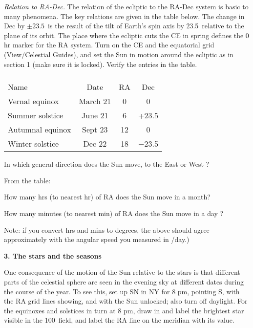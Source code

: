 \bigskip\noindent
\emph{Relation to RA-Dec.} The relation of the ecliptic to the RA-Dec
system is basic to many phenomena. The key relations are given in the
table below. The change in Dec by $\pm 23.5$\deg\ is the
result of the tilt of Earth's spin axis by 23.5\deg\ relative to the
plane of its orbit.  The place where the ecliptic cuts the CE in
spring defines the 0 hr marker for the RA system. Turn on the
CE and the equatorial grid (View/Celestial Guides), and
set the Sun in motion around the ecliptic as in section 1 (make sure
it is locked). Verify the entries in the table.


\begin{center}
\begin{tabular}{lccc} \hline \\ [-6pt]
Name & Date  & \hspace{1cm} RA \hspace{1cm} &Dec \\ [6pt]
\hline
Vernal equinox & March 21  & 0 & 0    \\ \hline
Summer solstice & June 21  & 6 & +23.5 \\ \hline
Autumnal equinox & Sept 23 & 12 &  0     \\ \hline
Winter solstice & Dec 22 & 18  & $-$23.5  \\ \hline
\end{tabular}
\end{center}



\medskip

In which general direction does the Sun move, to the East or West ?  \makebox[2cm]{\hrulefill}

From the table:

How many hrs (to nearest hr) of RA does the Sun move in a month?  \makebox[2cm]{\hrulefill}

How many minutes (to nearest min) of RA does the Sun move in a day ? 
\makebox[2cm]{\hrulefill}

\smallskip
\noindent Note: if you convert hrs and mins to degrees, the above should
agree approximately with the angular speed you measured in \deg/day.)

\bigskip
\noindent
{\bf 3. The stars and the seasons}


\medskip
\noindent
One consequence of the motion of the Sun relative to the stars is that
different parts of the celestial sphere are seen in the evening sky at
different dates during the course of the year. 
To see this, set up SN in NY for 8 pm, pointing S,
with the RA grid lines showing,
and with the Sun unlocked; also turn off daylight.  For the equinoxes
and solstices in turn at 8 pm, draw in and label the brightest star
visible in the 100\deg\ field, and label the RA line on the meridian
with its value.

